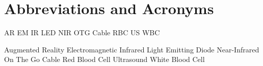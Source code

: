 \chapter{Abbreviations and Acronyms}\label{chapter:abbreviations}

\begin{multicols}{2}
\setlength{\parindent}{0pt}

	AR
	\hfill \break 
	EM
	\hfill \break 
	IR
	\hfill \break 
	LED
	\hfill \break 
	NIR
	\hfill \break 
	OTG Cable
	\hfill \break 
	RBC
	\hfill \break 
	US
	\hfill \break 
	WBC



	
\columnbreak
 
	Augmented Reality
	\hfill \break 
	Electromagnetic
	\hfill \break 
	Infrared
	\hfill \break 
	Light Emitting Diode
 	\hfill \break
	Near-Infrared
 	\hfill \break
	On The Go Cable
	\hfill \break
	Red Blood Cell 
	\hfill \break
	Ultrasound
	\hfill \break
	White Blood Cell 

\end{multicols}